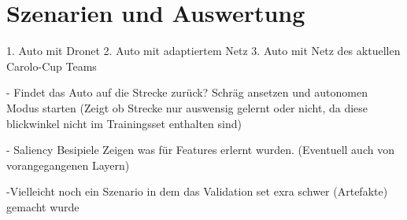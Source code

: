 %
\chapter{Szenarien und Auswertung}


1. Auto mit Dronet 
2. Auto mit adaptiertem Netz
3. Auto mit Netz des aktuellen Carolo-Cup Teams 

- Findet das Auto auf die Strecke zurück? Schräg ansetzen und autonomen Modus starten
(Zeigt ob Strecke nur auswensig gelernt oder nicht, da  diese blickwinkel nicht im Trainingsset enthalten sind)

- Saliency Besipiele Zeigen was für Features erlernt wurden. (Eventuell auch von vorangegangenen Layern)

-Vielleicht noch ein Szenario in dem das Validation set exra schwer (Artefakte) gemacht wurde